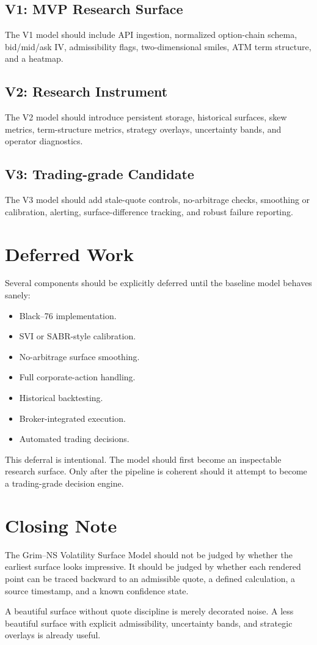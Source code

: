 \documentclass[11pt]{article}
\begin{document}
\subsection{V1: MVP Research Surface}

The V1 model should include API ingestion, normalized option-chain schema, bid/mid/ask IV, admissibility flags, two-dimensional smiles, ATM term structure, and a heatmap.

\subsection{V2: Research Instrument}

The V2 model should introduce persistent storage, historical surfaces, skew metrics, term-structure metrics, strategy overlays, uncertainty bands, and operator diagnostics.

\subsection{V3: Trading-grade Candidate}

The V3 model should add stale-quote controls, no-arbitrage checks, smoothing or calibration, alerting, surface-difference tracking, and robust failure reporting.

\section{Deferred Work}

Several components should be explicitly deferred until the baseline model behaves sanely:

\begin{itemize}[leftmargin=1.5em]
    \item Black--76 implementation.
    \item SVI or SABR-style calibration.
    \item No-arbitrage surface smoothing.
    \item Full corporate-action handling.
    \item Historical backtesting.
    \item Broker-integrated execution.
    \item Automated trading decisions.
\end{itemize}

This deferral is intentional. The model should first become an inspectable research surface. Only after the pipeline is coherent should it attempt to become a trading-grade decision engine.

\section{Closing Note}

The Grim--NS Volatility Surface Model should not be judged by whether the earliest surface looks impressive. It should be judged by whether each rendered point can be traced backward to an admissible quote, a defined calculation, a source timestamp, and a known confidence state.

A beautiful surface without quote discipline is merely decorated noise. A less beautiful surface with explicit admissibility, uncertainty bands, and strategic overlays is already useful.
\end{document}
